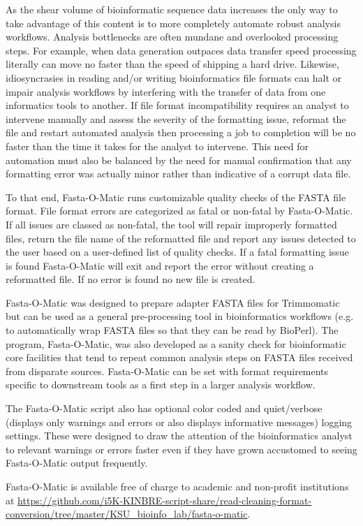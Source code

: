 As the shear volume of bioinformatic sequence data increases the only way to take advantage of this content is to more completely automate robust analysis workflows. Analysis bottlenecks are often mundane and overlooked processing steps. For example, when data generation outpaces data transfer speed processing literally can move no faster than the speed of shipping a hard drive. Likewise, idiosyncrasies in reading and/or writing bioinformatics file formats can halt or impair analysis workflows by interfering with the transfer of data from one informatics tools to another. If file format incompatibility requires an analyst to intervene manually and assess the severity of the formatting issue, reformat the file and restart automated analysis then processing a job to completion will be no faster than the time it takes for the analyst to intervene. This need for automation must also be balanced by the need for manual confirmation that any formatting error was actually minor rather than indicative of a corrupt data file. 

To that end, Fasta-O-Matic runs customizable quality checks of the FASTA file format. File format errors are categorized as fatal or non-fatal by Fasta-O-Matic.  If all issues are classed as non-fatal, the tool will repair improperly formatted files, return the file name of the reformatted file and report any issues detected to the user based on a user-defined list of quality checks. If a fatal formatting issue is found Fasta-O-Matic will exit and report the error without creating a reformatted file. If no error is found no new file is created.

Fasta-O-Matic was designed to prepare adapter FASTA files for Trimmomatic but can be used as a general pre-processing tool in bioinformatics workflows (e.g. to automatically wrap FASTA files so that they can be read by BioPerl). The program, Fasta-O-Matic, was also developed as a sanity check for bioinformatic core facilities that tend to repeat common analysis steps on FASTA files received from disparate sources. Fasta-O-Matic can be set with format requirements specific to downstream tools as a first step in a larger analysis workflow.

The Fasta-O-Matic script also has optional color coded and quiet/verbose (displays only warnings and errors or also displays informative messages) logging settings. These were designed to draw the attention of the bioinformatics analyst to relevant warnings or errors faster even if they have grown accustomed to seeing Fasta-O-Matic output frequently.

Fasta-O-Matic is available free of charge to academic and non-profit institutions at \url{https://github.com/i5K-KINBRE-script-share/read-cleaning-format-conversion/tree/master/KSU\_bioinfo\_lab/fasta-o-matic}.
  
  
  
  